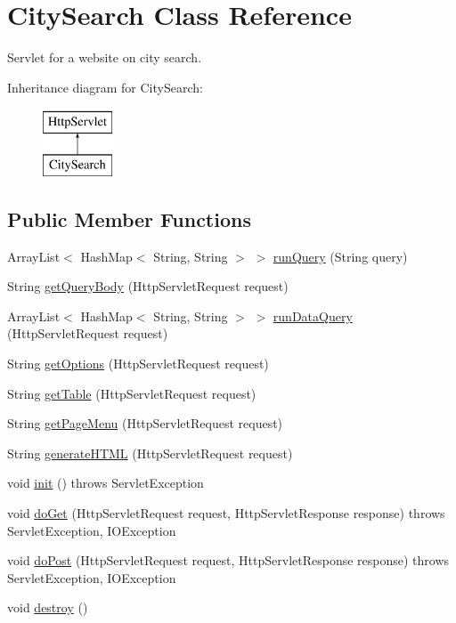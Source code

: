 \hypertarget{class_city_search}{}\section{City\+Search Class Reference}
\label{class_city_search}


Servlet for a website on city search.  


Inheritance diagram for City\+Search\+:\begin{figure}[H]
\begin{center}
\leavevmode
\includegraphics[height=2.000000cm]{class_city_search}
\end{center}
\end{figure}
\subsection*{Public Member Functions}
\begin{DoxyCompactItemize}
\item 
Array\+List$<$ Hash\+Map$<$ String, String $>$ $>$ \hyperlink{class_city_search_aa89f03a8e1e1ba6b4cca39d3a77d0aea}{run\+Query} (String query)
\item 
String \hyperlink{class_city_search_ad3169a9a050fb3efcc480eb9d4a31601}{get\+Query\+Body} (Http\+Servlet\+Request request)
\item 
Array\+List$<$ Hash\+Map$<$ String, String $>$ $>$ \hyperlink{class_city_search_a79b7b631af176e21aac968101fe4eb0d}{run\+Data\+Query} (Http\+Servlet\+Request request)
\item 
String \hyperlink{class_city_search_ae95f20000b6ffd73f58e20841a344c33}{get\+Options} (Http\+Servlet\+Request request)
\item 
String \hyperlink{class_city_search_a52cde722fb752e78e377a879d776041d}{get\+Table} (Http\+Servlet\+Request request)
\item 
String \hyperlink{class_city_search_a7ebefad5e5a6c895cf2f8bc350779165}{get\+Page\+Menu} (Http\+Servlet\+Request request)
\item 
String \hyperlink{class_city_search_ad8fa69bece192ae293c2dd96e614e337}{generate\+H\+T\+ML} (Http\+Servlet\+Request request)
\item 
void \hyperlink{class_city_search_ab392666fdc0948b40d90af4715429451}{init} ()  throws Servlet\+Exception 
\item 
void \hyperlink{class_city_search_a9e1fc3bb51d58588be7d55c80d97bc82}{do\+Get} (Http\+Servlet\+Request request, Http\+Servlet\+Response response)  throws Servlet\+Exception, I\+O\+Exception 
\item 
void \hyperlink{class_city_search_a1b194c808d33eb362a07eb4a87a6995f}{do\+Post} (Http\+Servlet\+Request request, Http\+Servlet\+Response response)  throws Servlet\+Exception, I\+O\+Exception 
\item 
void \hyperlink{class_city_search_a4fcacbf97c43741eff5acf8dd091f495}{destroy} ()
\end{DoxyCompactItemize}


